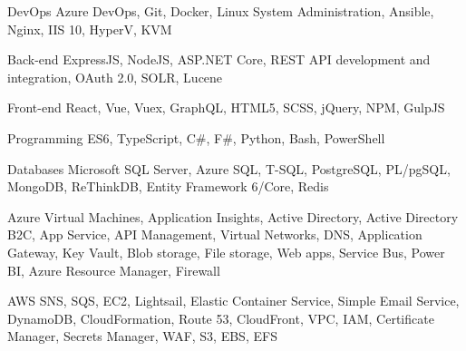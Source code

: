 

\begin{cvskills}

  \cvskill
    {DevOps} %
    {Azure DevOps, Git, Docker, Linux System Administration, Ansible, Nginx, IIS 10, HyperV, KVM} %

  \cvskill
    {Back-end} %
    {ExpressJS, NodeJS, ASP.NET Core, REST API development and integration, OAuth 2.0,  SOLR, Lucene} %

  \cvskill
    {Front-end} %
    {React, Vue, Vuex, GraphQL, HTML5, SCSS, jQuery, NPM, GulpJS} %

  \cvskill
    {Programming} %
    {ES6, TypeScript, C\#, F\#, Python, Bash, PowerShell} %

  \cvskill
    {Databases} %
    {Microsoft SQL Server, Azure SQL, T-SQL, PostgreSQL, PL/pgSQL, MongoDB, ReThinkDB, Entity Framework 6/Core, Redis} %

  \cvskill
    {Azure} %
    {Virtual Machines, Application Insights, Active Directory, Active Directory B2C, App Service, API Management, Virtual Networks, DNS, Application Gateway, Key Vault, Blob storage, File storage, Web apps, Service Bus, Power BI, Azure Resource Manager, Firewall} %

  \cvskill
    {AWS} %
    {SNS, SQS, EC2, Lightsail, Elastic Container Service, Simple Email Service, DynamoDB, CloudFormation, Route 53, CloudFront, VPC, IAM, Certificate Manager, Secrets Manager, WAF, S3, EBS, EFS} %

\end{cvskills}
